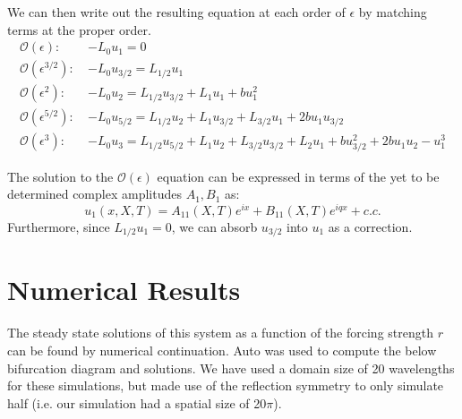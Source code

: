 \documentclass[api,pof,pre,12pt,a4paper]{revtex4-1}
\newcommand{\beqn}{\begin{equation}}
\newcommand{\eeqn}{\end{equation}}
\begin{document}
We can then write out the resulting equation at each order of $\epsilon$ by matching terms at the proper order.
\begin{subequations}
\begin{align}
\mathcal{O}(\epsilon): \:  &-L_0 u_1 =0
\label{eq:msh23o1b} \\
\mathcal{O}(\epsilon^{3/2}): \: &-L_0 u_{3/2} = L_{1/2} u_1 
\label{eq:msh23o15b} \\
\mathcal{O}(\epsilon^2): \:  &-L_0 u_2 = L_{1/2} u_{3/2} +L_1 u_1 +b u_1^2
\label{eq:msh23o2b}\\
\mathcal{O}(\epsilon^{5/2}): \:  &-L_0 u_{5/2} = L_{1/2} u_{2} +L_1 u_{3/2}+ L_{3/2} u_1 +2b u_1 u_{3/2}
\label{eq:msh23o25b}\\
\mathcal{O}(\epsilon^{3}): \:  &-L_0 u_{3} = L_{1/2} u_{5/2} +L_1 u_{2}+ L_{3/2} u_{3/2}+L_2 u_1   +b u_{3/2}^2+2b u_1 u_2 -u_1^3
\label{eq:msh23o25b}
\end{align}
\end{subequations}

The solution to the $\mathcal{O}(\epsilon)$ equation can be expressed in terms of the yet to be determined complex amplitudes $A_1, B_1$ as:
\beqn
u_1(x,X,T)=A_{11}(X,T)e^{i x} +B_{11}(X,T)e^{i q x} +c.c.
\label{eq:sol23o1}
\eeqn
Furthermore, since $L_{1/2} u_1=0$, we can absorb $u_{3/2}$ into $u_1$ as a correction. 


\section{Numerical Results}
The steady state solutions of this system as a function of the forcing strength $r$ can be found by numerical continuation.  Auto was used to compute the below bifurcation diagram and solutions.  We have used a domain size of 20 wavelengths for these simulations, but made use of the reflection symmetry to only simulate half (i.e. our simulation had a spatial size of 20$\pi$).  
\end{document}
